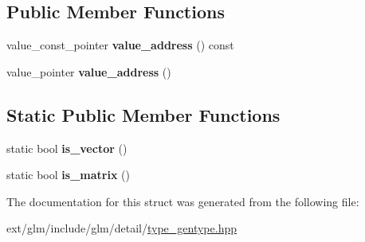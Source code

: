 \subsection*{Public Member Functions}
\begin{DoxyCompactItemize}
\item 
\hypertarget{structglm_1_1detail_1_1gen_type_a63fb77e77082f34c0a0d7faa0906f7f4}{value\-\_\-const\-\_\-pointer {\bfseries value\-\_\-address} () const }\label{structglm_1_1detail_1_1gen_type_a63fb77e77082f34c0a0d7faa0906f7f4}

\item 
\hypertarget{structglm_1_1detail_1_1gen_type_a146973ec142766743080c1895a9e3c65}{value\-\_\-pointer {\bfseries value\-\_\-address} ()}\label{structglm_1_1detail_1_1gen_type_a146973ec142766743080c1895a9e3c65}

\end{DoxyCompactItemize}
\subsection*{Static Public Member Functions}
\begin{DoxyCompactItemize}
\item 
\hypertarget{structglm_1_1detail_1_1gen_type_ae83087df55201bdc46a37decf3d1c34c}{static bool {\bfseries is\-\_\-vector} ()}\label{structglm_1_1detail_1_1gen_type_ae83087df55201bdc46a37decf3d1c34c}

\item 
\hypertarget{structglm_1_1detail_1_1gen_type_a78c650375558d5e2ccfba383cdb59479}{static bool {\bfseries is\-\_\-matrix} ()}\label{structglm_1_1detail_1_1gen_type_a78c650375558d5e2ccfba383cdb59479}

\end{DoxyCompactItemize}


The documentation for this struct was generated from the following file\-:\begin{DoxyCompactItemize}
\item 
ext/glm/include/glm/detail/\hyperlink{type__gentype_8hpp}{type\-\_\-gentype.\-hpp}\end{DoxyCompactItemize}
